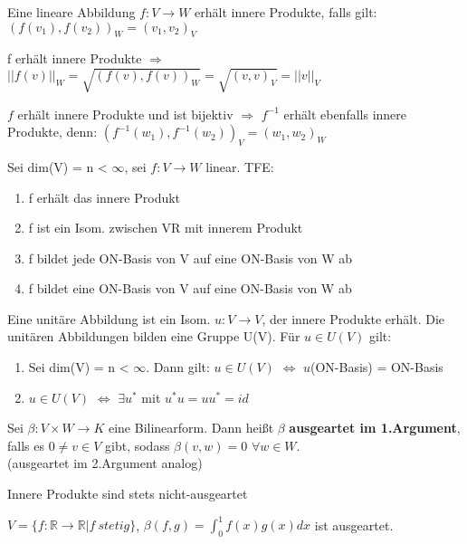\begin{theorem}
\leavevmode
\begin{compactitem}
\item Eine lineare Abbildung $f: V \to W$ erhält innere Produkte, falls gilt: $(f(v_1), f(v_2))_W = (v_1, v_2)_V$
\item f erhält innere Produkte $\Rightarrow$ $||f(v)||_W = \sqrt{(f(v), f(v))_W} = \sqrt{(v,v)_V} = ||v||_V$
\item $f$ erhält innere Produkte und ist bijektiv $\Rightarrow$ $f^{-1}$ erhält ebenfalls innere Produkte, denn: $(f^{-1}(w_1), f^{-1}(w_2))_V = (w_1, w_2)_W$
\item Sei dim(V) = n < $\infty$, sei $f: V \to W$ linear. TFE:
\begin{enumerate}
\item f erhält das innere Produkt
\item f ist ein Isom. zwischen VR mit innerem Produkt
\item f bildet jede ON-Basis von V auf eine ON-Basis von W ab
\item f bildet eine ON-Basis von V auf eine ON-Basis von W ab
\end{enumerate}
Eine unitäre Abbildung ist ein Isom. $u: V \to V$, der innere Produkte erhält.
Die unitären Abbildungen bilden eine Gruppe U(V). Für $u \in U(V)$ gilt:
\begin{enumerate}
\item Sei dim(V) = n < $\infty$. Dann gilt: $u \in U(V)$ $\Leftrightarrow$ $u$(ON-Basis) = ON-Basis
\item $u \in U(V)$ $\Leftrightarrow$ $\exists u^*$ mit $u^*u=uu^*=id$
\end{enumerate}
\end{compactitem}
\end{theorem}

\begin{definition}
Sei $\beta: V \times W \to K$ eine Bilinearform. Dann heißt $\beta$ \textbf{ausgeartet im 1.Argument}, falls es $0 \neq v \in V$ gibt, sodass $\beta(v,w) = 0$ $\forall w \in W$.\\
(ausgeartet im 2.Argument analog)
\end{definition}
\begin{remark}
\leavevmode
\begin{compactitem}
\item Innere Produkte sind stets nicht-ausgeartet
\item $V = \{ f: \mathbb{R} \to \mathbb{R} | f~stetig \}$, $\beta(f,g) = \displaystyle\int_0^1 f(x) g(x) dx$ ist ausgeartet.
\end{compactitem}
\end{remark}